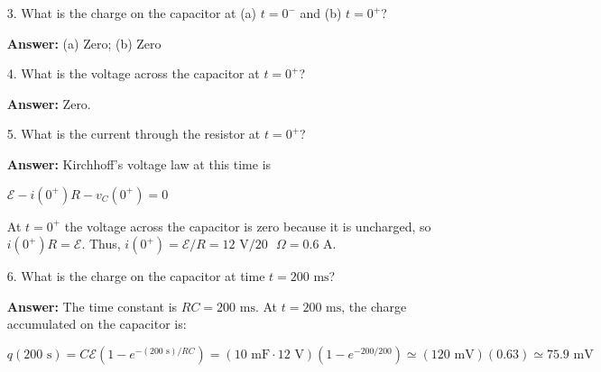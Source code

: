 \documentclass{article}
\begin{document}
\begin{enumerate}

  \item[3.] What is the charge on the capacitor at (a) $t=0^-$ and (b) $t=0^+$?

            \ifsolutions
            {\bf Answer: } (a) Zero; (b) Zero
            \else
            \vskip 56.25pt
            \fi
            \ifsolutions\else
            \vskip 56.25pt
            \fi

  \item[4.] What is the voltage across the capacitor at $t=0^+$?

            \ifsolutions
            {\bf Answer: } Zero.
            \else
            \vskip 56.25pt
            \fi
            \ifsolutions\else
            \vskip 56.25pt
            \fi

  \item[5.] What is the current through the resistor at $t=0^+$?

            \ifsolutions
            {\bf Answer:} Kirchhoff's voltage law at this time is

            $\mathcal{E}-i(0^+)R-v_C(0^+)=0$

            At $t=0^+$ the voltage across the capacitor is zero because it is uncharged, so $i(0^+)R=\mathcal{E}$. Thus, $i(0^+) = \mathcal{E}/R = 12\text{ V}/20\text{ }\Omega = 0.6\text{ A}$.
            \else
            \vskip 56.25pt
            \fi
            \ifsolutions\else
            \vskip 56.25pt
            \fi

  \item[6.] What is the charge on the capacitor at time $t = 200\text{ ms}$?

            \ifsolutions
            {\bf Answer: } The time constant is $RC=200\text{ ms}$. At $t=200\text{ ms}$, the charge accumulated on the capacitor is:

            \begin{equation}
            q(200\text{ s}) = C\mathcal{E}(1-e^{-(200\text{ s})/RC}) = (10\text{ mF} \cdot 12\text{ V})(1-e^{-200/200})\simeq (120\text{ mV})(0.63)\simeq 75.9\text{ mV}
            \end{equation}
            \else

            \fi
            \ifsolutions\else

            \fi

\end{enumerate}
\end{document}
